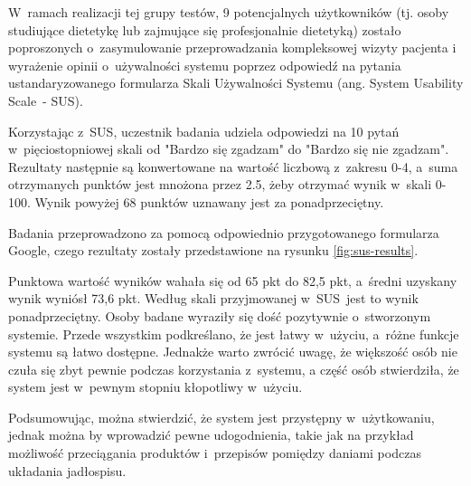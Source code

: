 \par
W~ramach realizacji tej grupy testów, 9 potencjalnych użytkowników (tj. osoby studiujące dietetykę lub zajmujące się profesjonalnie dietetyką)
zostało poproszonych o~zasymulowanie przeprowadzania kompleksowej wizyty pacjenta
i wyrażenie opinii o~używalności systemu poprzez odpowiedź na pytania ustandaryzowanego formularza Skali Używalności Systemu (ang. System Usability Scale~- SUS)\cite{url:sus}.

\par
Korzystając z~SUS, uczestnik badania udziela odpowiedzi na 10 pytań w~pięciostopniowej skali od "Bardzo się zgadzam" do "Bardzo się nie zgadzam".
Rezultaty następnie są konwertowane na wartość liczbową z~zakresu 0-4, a~suma otrzymanych punktów jest mnożona przez 2.5, żeby otrzymać wynik w~skali 0-100.
Wynik powyżej 68 punktów uznawany jest za ponadprzeciętny.
\par
Badania przeprowadzono za pomocą odpowiednio przygotowanego formularza Google\cite{tech:google-forms}, czego rezultaty zostały przedstawione na rysunku \ref{fig:sus-results}.
%
%


Punktowa wartość wyników wahała się od 65 pkt do 82,5 pkt, a~średni uzyskany wynik wyniósł 73,6 pkt.
Według skali przyjmowanej w~SUS~jest to wynik ponadprzeciętny.
Osoby badane wyraziły się dość pozytywnie o~stworzonym systemie.
Przede wszystkim podkreślano, że jest łatwy w~użyciu, a~różne funkcje systemu są łatwo dostępne.
Jednakże warto zwrócić uwagę, że większość osób nie czuła się zbyt pewnie podczas korzystania z~systemu,
a część osób stwierdziła, że system jest w~pewnym stopniu kłopotliwy w~użyciu.

\par
Podsumowując, można stwierdzić, że system jest przystępny w~użytkowaniu, jednak można by wprowadzić pewne udogodnienia,
takie jak na przykład możliwość przeciągania produktów i~przepisów pomiędzy daniami podczas układania jadłospisu.

\thispagestyle{normal}

